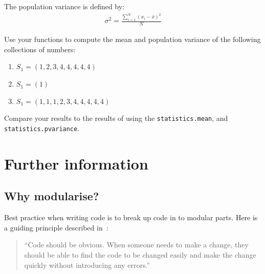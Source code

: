 \begin{enumerate}
The population variance is defined by:
\begin{equation*}
\begin{split}
    \sigma ^ 2 = \frac{\sum_{i=1}^{N} (x_i - \bar x) ^ 2}{N}
   \end{split}
\end{equation*}

Use your functions to compute the mean and population variance of the following
collections of numbers:
\begin{enumerate}

\item 

\(S_1=(1, 2, 3, 4, 4, 4, 4, 4)\)

\item 

\(S_1=(1)\)

\item 

\(S_1=(1, 1, 1, 2, 3, 4, 4, 4, 4, 4)\)

\end{enumerate}


Compare your results to the results of using the \texttt{statistics.mean},
and \texttt{statistics.pvariance}. 

\end{enumerate}



\section{Further information}
\label{\detokenize{building-tools/05-modularisation/why/main:further-information}}\label{\detokenize{building-tools/05-modularisation/why/main::doc}}

\subsection{Why modularise?}
\label{\detokenize{building-tools/05-modularisation/why/main:why-modularise}}\label{\detokenize{building-tools/05-modularisation/why/main:id1}}

Best practice when writing code is to break up code in to modular parts. Here is
a
guiding principle described in~\cite{fowler2018refactoring}:




\begin{quote}
``Code should be obvious. When someone needs to make a change, they should be
able to find the code to be changed easily and make the change quickly without
introducing any errors.''
\end{quote}







